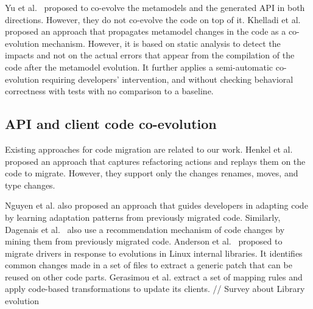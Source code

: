  Yu et al.~\cite{yu2012maintaining} proposed to co-evolve the metamodels and the generated API in both directions. However, they do not co-evolve the code on top of it.%
 Khelladi et al.~\cite{Khelladi2020} proposed an approach that propagates metamodel changes in the code as a co-evolution mechanism. However, it is based on static analysis to detect the impacts and not on the actual errors that appear from the compilation of the code after the metamodel evolution. It further applies a semi-automatic co-evolution requiring developers' intervention, and without checking behavioral correctness with tests with no comparison to a baseline. 
 
 
 \subsection{API and client code co-evolution}
 \label{API_evolution}
 
 
 Existing approaches for code migration are related to our work.%
  Henkel et al.~\cite{henkel2005catchup} proposed an approach that captures refactoring actions and replays them on the code to migrate. However, they support only the changes renames, moves, and type changes. 
 
 Nguyen et al. \cite{nguyen2010graph} also proposed an approach that guides developers in adapting code by learning adaptation patterns from previously migrated code. Similarly, Dagenais et al.~\cite{dagenais2011recommending,5070565,10.1145/1932682.1869486} also use a recommendation mechanism of code changes by mining them from previously migrated code. 
 Anderson et al.~\cite{andersen2010generic} proposed to migrate drivers in response to evolutions in Linux internal libraries. It identifies common changes made in a set of files to extract a generic patch that can be reused on other code parts. Gerasimou et al. \cite{10.1145/3194793.3194798} extract a set of mapping rules and apply code-based transformations to update its clients.
 // Survey about Library evolution \cite{10043250}
 
% 
 
